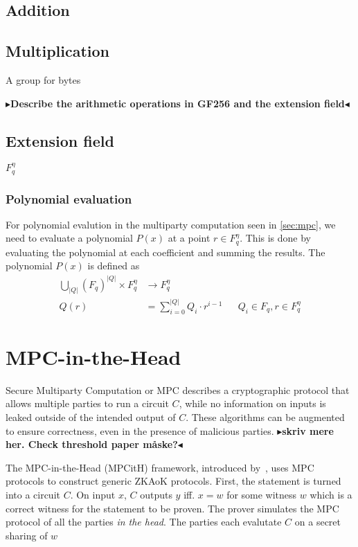 \documentclass[twoside,11pt,openright]{report}
\theoremstyle{definition}
\theoremstyle{plain}
\newcommand{\todo}[1]{{\color[rgb]{.5,0,0}\textbf{$\blacktriangleright$#1$\blacktriangleleft$}}}
\begin{document}
\subsection{Addition}
\subsection{Multiplication}

A group for bytes

\todo{Describe the arithmetic operations in GF256 and the extension field}


\subsection{Extension field}
$F_q^\eta$

\subsubsection{Polynomial evaluation}
For polynomial evalution in the multiparty computation seen in \autoref{sec:mpc}, we need to evaluate a polynomial $P(x)$ at a point $r \in F_q^\eta$. This is done by evaluating the polynomial at each coefficient and summing the results. The polynomial $P(x)$ is defined as
\begin{align}
  \textstyle\bigcup_{|Q|}(F_q)^{|Q|} \times F_q^\eta & \rightarrow F_q^\eta                 \nonumber                                  \\
  Q(r)                                               & = \textstyle\sum_{i=0}^{|Q|} Q_i \cdot r^{i-1} &  & Q_i \in F_q, r \in F_q^\eta
  \label{eq:mpcpoly}
\end{align}

\section{MPC-in-the-Head}
\label{sec:mpcinth}

Secure Multiparty Computation or MPC describes a cryptographic protocol that allows multiple parties to run a circuit $C$, while no information on inputs is leaked outside of the intended output of $C$. These algorithms can be augmented to ensure correctness, even in the presence of malicious parties. \todo{skriv mere her. Check threshold paper måske?}

The MPC-in-the-Head (MPCitH) framework, introduced by~\cite{ishai2007zero}, uses MPC protocols to construct generic ZKAoK protocols. First, the statement is turned into a circuit $C$. On input $x$, $C$ outputs $y$ iff. $x = w$ for some witness $w$ which is a correct witness for the statement to be proven. The prover simulates the MPC protocol of all the parties \textit{in the head}. The parties each evalutate $C$ on a secret sharing of $w$
\end{document}

